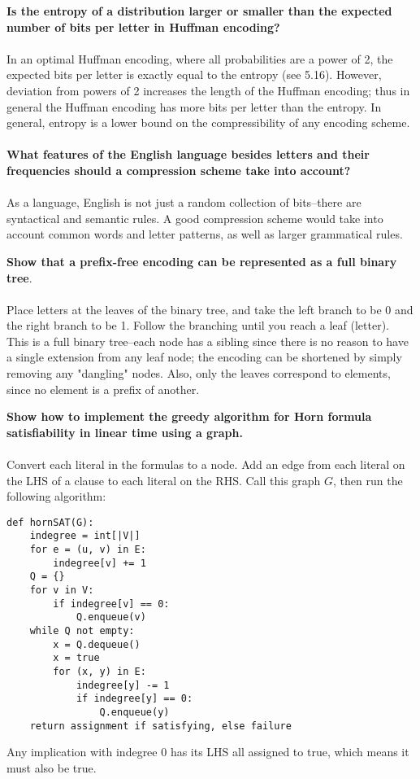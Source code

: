 \begin{problem}{5.18}
\textbf{Is the entropy of a distribution larger or smaller than the expected number of bits per letter in Huffman encoding?}
\\
\\
In an optimal Huffman encoding, where all probabilities are a power of 2, the expected bits per letter is exactly equal to the entropy (see 5.16). However, deviation from powers of 2 increases the length of the Huffman encoding; thus in general the Huffman encoding has more bits per letter than the entropy. In general, entropy is a lower bound on the compressibility of any encoding scheme.
\\
\\
\textbf{What features of the English language besides letters and their frequencies should a compression scheme take into account?}
\\
\\
As a language, English is not just a random collection of bits--there are syntactical and semantic rules. A good compression scheme would take into account common words and letter patterns, as well as larger grammatical rules.
\end{problem}

\begin{problem}{5.28}
\textbf{Show that a prefix-free encoding can be represented as a full binary tree}.
\\
\\
Place letters at the leaves of the binary tree, and take the left branch to be 0 and the right branch to be 1. Follow the branching until you reach a leaf (letter).
\\
This is a full binary tree--each node has a sibling since there is no reason to have a single extension from any leaf node; the encoding can be shortened by simply removing any "dangling" nodes. Also, only the leaves correspond to elements, since no element is a prefix of another.
\end{problem}

\begin{problem}{5.32}
\textbf{Show how to implement the greedy algorithm for Horn formula satisfiability in linear time using a graph.}
\\
\\
Convert each literal in the formulas to a node. Add an edge from each literal on the LHS of a clause to each literal on the RHS. Call this graph $G$, then run the following algorithm:
\begin{lstlisting}[mathescape=true]
def hornSAT(G):
    indegree = int[|V|]
    for e = (u, v) in E:
        indegree[v] += 1
    Q = {}
    for v in V:
        if indegree[v] == 0:
            Q.enqueue(v)
    while Q not empty:
        x = Q.dequeue()
        x = true
        for (x, y) in E:
            indegree[y] -= 1
            if indegree[y] == 0:
                Q.enqueue(y)
    return assignment if satisfying, else failure            
\end{lstlisting}
Any implication with indegree 0 has its LHS all assigned to true, which means it must also be true.
\end{problem}


